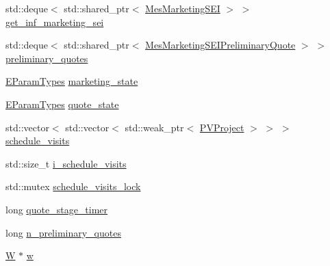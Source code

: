 {\bf }\par
\begin{DoxyCompactItemize}
\item 
std\+::deque$<$ std\+::shared\+\_\+ptr$<$ \hyperlink{classsolar__core_1_1_mes_marketing_s_e_i}{Mes\+Marketing\+S\+E\+I} $>$ $>$ \hyperlink{classsolar__core_1_1_household_a3ae4cec5fca43ee5ca3287a01f5a05a2}{get\+\_\+inf\+\_\+marketing\+\_\+sei}
\item 
std\+::deque$<$ std\+::shared\+\_\+ptr$<$ \hyperlink{classsolar__core_1_1_mes_marketing_s_e_i_preliminary_quote}{Mes\+Marketing\+S\+E\+I\+Preliminary\+Quote} $>$ $>$ \hyperlink{classsolar__core_1_1_household_a297842358a2d79db160566106972bc0d}{preliminary\+\_\+quotes}
\item 
\hyperlink{namespacesolar__core_aa1147341e5ef7a40d68d1bd68e149362}{E\+Param\+Types} \hyperlink{classsolar__core_1_1_household_a3ee8b2654cad46236d11f85a4ccd9574}{marketing\+\_\+state}
\end{DoxyCompactItemize}

{\bf }\par
\begin{DoxyCompactItemize}
\item 
\hyperlink{namespacesolar__core_aa1147341e5ef7a40d68d1bd68e149362}{E\+Param\+Types} \hyperlink{classsolar__core_1_1_household_a4ae618de9a28895317824b185b57ab24}{quote\+\_\+state}
\item 
std\+::vector$<$ std\+::vector$<$ std\+::weak\+\_\+ptr$<$ \hyperlink{classsolar__core_1_1_p_v_project}{P\+V\+Project} $>$ $>$ $>$ \hyperlink{classsolar__core_1_1_household_aadd4e3e2fc66ed214bcfadf37f557b14}{schedule\+\_\+visits}
\item 
std\+::size\+\_\+t \hyperlink{classsolar__core_1_1_household_a077c668f06c009a43c535f1ad92cf92e}{i\+\_\+schedule\+\_\+visits}
\item 
std\+::mutex \hyperlink{classsolar__core_1_1_household_a15e598cfc419040a23f75fe08a8ef1d8}{schedule\+\_\+visits\+\_\+lock}
\item 
long \hyperlink{classsolar__core_1_1_household_a6b35426fd691daa6d352ec34a6ec6e4d}{quote\+\_\+stage\+\_\+timer}
\item 
long \hyperlink{classsolar__core_1_1_household_aedfc08b7837a3e2fa6ad9e62309694f3}{n\+\_\+preliminary\+\_\+quotes}
\end{DoxyCompactItemize}

{\bf }\par
\begin{DoxyCompactItemize}
\item 
\hyperlink{classsolar__core_1_1_w}{W} $\ast$ \hyperlink{classsolar__core_1_1_household_a01ac4643c725f397ba7485209a906e4d}{w}
\end{DoxyCompactItemize}

